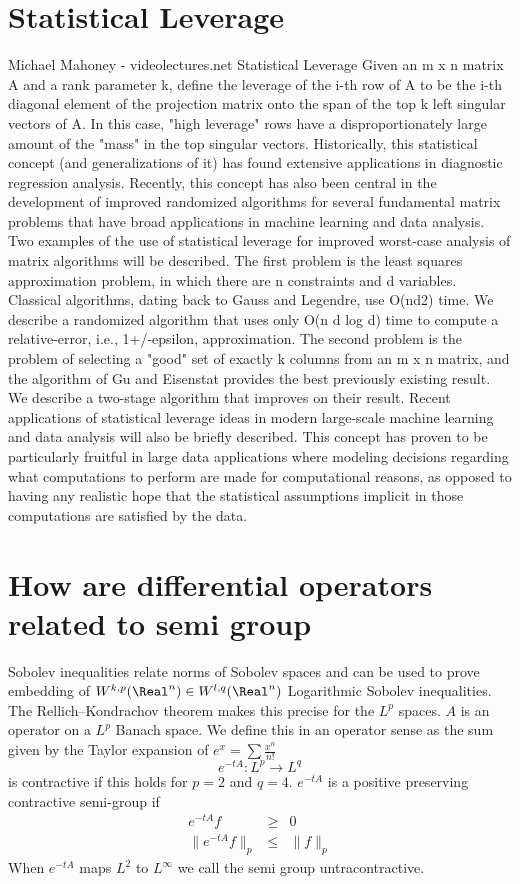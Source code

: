 \section*{Statistical Leverage}
Michael Mahoney - videolectures.net Statistical Leverage Given an m x n matrix A and a rank parameter k, define the leverage of the i-th row of A to be the i-th diagonal element of the projection matrix onto the span of the top k left singular vectors of A. In this case, "high leverage" rows have a disproportionately large amount of the "mass" in the top singular vectors. Historically, this statistical concept (and generalizations of it) has found extensive applications in diagnostic regression analysis. Recently, this concept has also been central in the development of improved randomized algorithms for several fundamental matrix problems that have broad applications in machine learning and data analysis. Two examples of the use of statistical leverage for improved worst-case analysis of matrix algorithms will be described. The first problem is the least squares approximation problem, in which there are n constraints and d variables. Classical algorithms, dating back to Gauss and Legendre, use O(nd2) time. We describe a randomized algorithm that uses only O(n d log d) time to compute a relative-error, i.e., 1+/-epsilon, approximation. The second problem is the problem of selecting a "good" set of exactly k columns from an m x n matrix, and the algorithm of Gu and Eisenstat provides the best previously existing result. We describe a two-stage algorithm that improves on their result. Recent applications of statistical leverage ideas in modern large-scale machine learning and data analysis will also be briefly described. This concept has proven to be particularly fruitful in large data applications where modeling decisions regarding what computations to perform are made for computational reasons, as opposed to having any realistic hope that the statistical assumptions implicit in those computations are satisfied by the data.

\section*{How are differential operators related to semi group}
Sobolev inequalities relate norms of Sobolev spaces and can be used to prove embedding of $W^{k,p}(\Real^n) \in W^{l,q}(\Real^n)$ Logarithmic Sobolev inequalities.  The Rellich–Kondrachov theorem makes this precise for the $L^p$ spaces.
$A$ is an operator on a $L^p$ Banach space. We define this in an operator sense as the sum given by the Taylor expansion of $e^x = \sum \frac{x^n}{n!}$
\begin{equation*}
  e^{-t A} : L^p \rightarrow L^q
\end{equation*} is contractive if this holds for $p=2$ and $q=4$.
$e^{-t A}$ is a positive preserving contractive semi-group if
\begin{eqnarray*}
  e^{-t A} f &\geq& 0 \\
  \parallel e^{-t A} f \parallel_p &\leq& \parallel f \parallel_p
\end{eqnarray*}
When $e^{-t A}$ maps $L^2$ to $L^\infty$ we call the semi group untracontractive.

